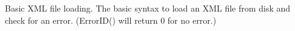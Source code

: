  Basic X\+M\+L file loading. The basic syntax to load an X\+M\+L file from disk and check for an error. (Error\+I\+D() will return 0 for no error.) 
\begin{DoxyCodeInclude}

\end{DoxyCodeInclude}
 